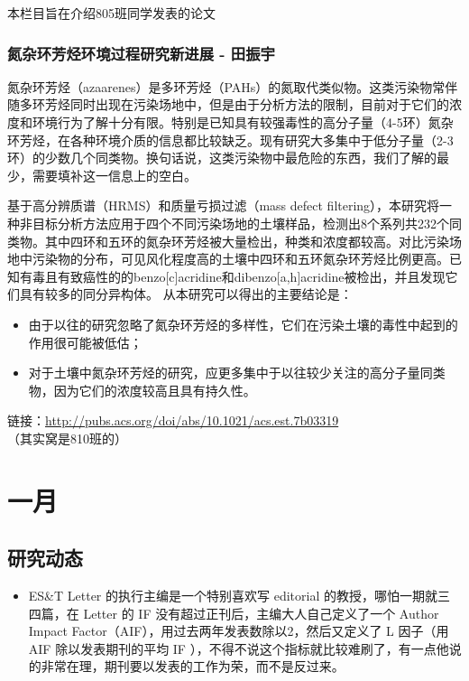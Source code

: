 \documentclass[]{book}
\providecommand{\tightlist}{%
  \setlength{\itemsep}{0pt}\setlength{\parskip}{0pt}}
\begin{document}
本栏目旨在介绍805班同学发表的论文

\subsubsection*{氮杂环芳烃环境过程研究新进展 - 田振宇}\label{---}

氮杂环芳烃（azaarenes）是多环芳烃（PAHs）的氮取代类似物。这类污染物常伴随多环芳烃同时出现在污染场地中，但是由于分析方法的限制，目前对于它们的浓度和环境行为了解十分有限。特别是已知具有较强毒性的高分子量（4-5环）氮杂环芳烃，在各种环境介质的信息都比较缺乏。现有研究大多集中于低分子量（2-3环）的少数几个同类物。换句话说，这类污染物中最危险的东西，我们了解的最少，需要填补这一信息上的空白。

基于高分辨质谱（HRMS）和质量亏损过滤（mass defect
filtering），本研究将一种非目标分析方法应用于四个不同污染场地的土壤样品，检测出8个系列共232个同类物。其中四环和五环的氮杂环芳烃被大量检出，种类和浓度都较高。对比污染场地中污染物的分布，可见风化程度高的土壤中四环和五环氮杂环芳烃比例更高。已知有毒且有致癌性的的benzo{[}c{]}acridine和dibenzo{[}a,h{]}acridine被检出，并且发现它们具有较多的同分异构体。
从本研究可以得出的主要结论是：

\begin{itemize}
\item
  由于以往的研究忽略了氮杂环芳烃的多样性，它们在污染土壤的毒性中起到的作用很可能被低估；
\item
  对于土壤中氮杂环芳烃的研究，应更多集中于以往较少关注的高分子量同类物，因为它们的浓度较高且具有持久性。
\end{itemize}

链接：\url{http://pubs.acs.org/doi/abs/10.1021/acs.est.7b03319}
（其实窝是810班的）

\section*{一月}

\subsection*{研究动态}\label{-2}

\begin{itemize}
\tightlist
\item
  ES\&T Letter 的执行主编是一个特别喜欢写 editorial
  的教授，哪怕一期就三四篇，在 Letter 的 IF
  没有超过正刊后，主编大人自己定义了一个 Author Impact
  Factor（AIF），用过去两年发表数除以2，然后又定义了 L 因子（用 AIF
  除以发表期刊的平均 IF
  ），不得不说这个指标就比较难刷了，有一点他说的非常在理，期刊要以发表的工作为荣，而不是反过来。
\end{itemize}
\end{document}
